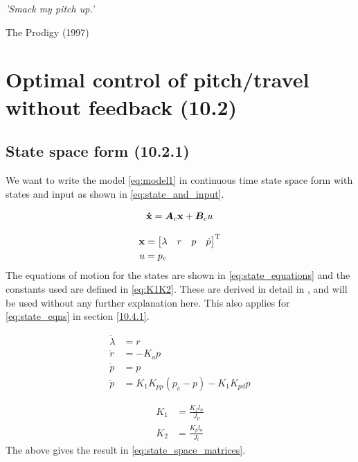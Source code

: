 \epigraph{\textit{'Smack my pitch up.'}}{The Prodigy (1997)}

\section{Optimal control of pitch/travel without feedback (10.2)}

\subsection{State space form (10.2.1)}
We want to write the model \eqref{eq:model1} in continuous time state space form with states and input as shown in \eqref{eq:state_and_input}.

\begin{equation}\label{eq:model1}
	\mathbf{\dot{x}} = \bm{A}_{c}\mathbf{x} + \bm{B}_{c}u
\end{equation}

\begin{equation}\label{eq:state_and_input}
\begin{aligned}
	\mathbf{x} 	&= \begin{bmatrix}\lambda & r & p & \dot{p} \end{bmatrix}^{\text{T}} \\
	u 		&= p_{c}
\end{aligned}
\end{equation}
The equations of motion for the states are shown in \eqref{eq:state_equations} and the constants used are defined in \eqref{eq:K1K2}. These are derived in detail in \cite{_helicopter_2015}, and will be used without any further explanation here. This also applies for \eqref{eq:state_eqns} in section \ref{10.4.1}. 

\begin{equation}\label{eq:state_equations}
\begin{aligned}
	\dot{\lambda} 	&= r \\
	\dot{r} 		&= - K_{a} p \\
	\dot{p} 		&= \dot{p} \\
	\ddot{p} 		&= K_{1} K_{pp} (p_{c} - p) - K_{1} K_{pd} \dot{p}
\end{aligned}
\end{equation}

\begin{equation}\label{eq:K1K2}
\begin{aligned}
	K_{1} &= \frac{K_{f} l_{n}}{J_{p}} \\
	K_{2} &= \frac{K_{p} l_{a}}{J_{t}}
\end{aligned}
\end{equation}
The above gives the result in \eqref{eq:state_space_matrices}.

